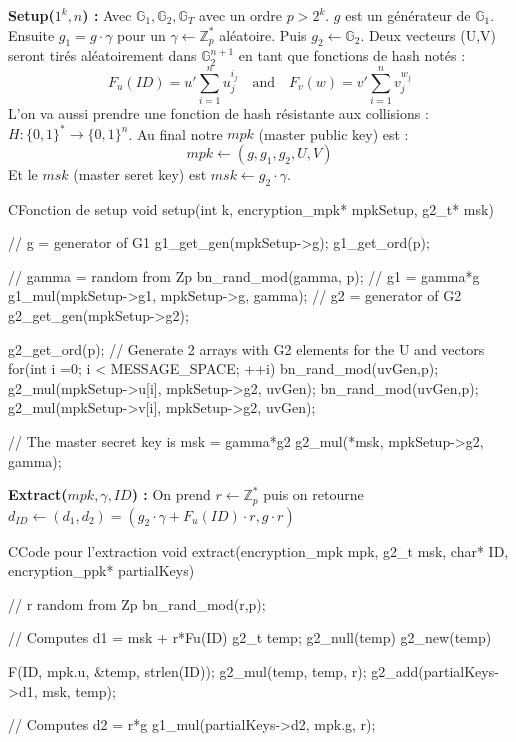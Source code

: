 \textbf{Setup($1^k, n$) :} Avec $\mathbb{G}_1, \mathbb{G}_2, \mathbb{G}_T$ avec un ordre $p > 2^k$. $g$ est un générateur de $\mathbb{G}_1$. Ensuite  $g_1 = g \cdot \gamma$ pour un $\gamma \leftarrow  \mathbb{Z}_p^*$ aléatoire. Puis $g_2 \leftarrow \mathbb{G}_2$. Deux vecteurs (U,V) seront tirés aléatoirement dans $\mathbb{G}_2^{n+1}$ en tant que fonctions de hash notés :
\[F_u(ID) = u' \sum_{i=1}^{n} u_j^{i_j}\quad\mathrm{and}\quad F_v(w) = v' \sum_{i=1}^{n} v_j^{w_j}\]
L'on va aussi prendre une fonction de hash résistante aux collisions : $H : \{0,1\}^* \rightarrow \{0,1\}^n$. Au final notre $mpk$ (master public key) est :
\[mpk \leftarrow (g, g_1, g_2, U, V)\]
Et le $msk$ (master seret key) est $msk \leftarrow g_2 \cdot \gamma$.

\begin{sourcebox}{C}{Fonction de setup}
	void setup(int k, encryption_mpk* mpkSetup, g2_t* msk){
		// g = generator of G1
		g1_get_gen(mpkSetup->g);
		g1_get_ord(p);
		
		// gamma = random from Zp
		bn_rand_mod(gamma, p);
		// g1 = gamma*g
		g1_mul(mpkSetup->g1, mpkSetup->g, gamma);
		// g2 = generator of G2
		g2_get_gen(mpkSetup->g2);
		
		g2_get_ord(p);
		// Generate 2 arrays with G2 elements for the U and  vectors
		for(int i =0; i < MESSAGE_SPACE; ++i){
			bn_rand_mod(uvGen,p);
			g2_mul(mpkSetup->u[i], mpkSetup->g2, uvGen);
			bn_rand_mod(uvGen,p);
			g2_mul(mpkSetup->v[i], mpkSetup->g2, uvGen);
		}
		
		// The master secret key is msk = gamma*g2
		g2_mul(*msk, mpkSetup->g2, gamma);
	}
\end{sourcebox}

\textbf{Extract($mpk, \gamma, ID$) :} On prend $r \leftarrow \mathbb{Z}_p^*$ puis on retourne $d_{ID} \leftarrow (d_1, d_2) = (g_2 \cdot \gamma + F_u(ID) \cdot r, g \cdot r)$

\begin{sourcebox}{C}{Code pour l'extraction}
	void extract(encryption_mpk mpk, g2_t msk, char* ID, encryption_ppk* partialKeys){
		// r random from Zp
		bn_rand_mod(r,p);
		
		// Computes d1 = msk + r*Fu(ID)
		g2_t temp;
		g2_null(temp)
		g2_new(temp)
		
		F(ID, mpk.u, &temp, strlen(ID));
		g2_mul(temp, temp, r);
		g2_add(partialKeys->d1, msk, temp);
		
		// Computes d2 = r*g
		g1_mul(partialKeys->d2, mpk.g, r);
	}
\end{sourcebox}

